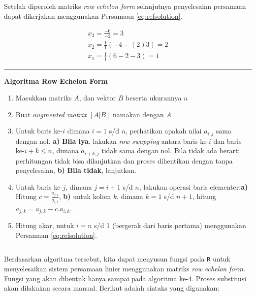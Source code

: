 \documentclass[]{book}
\providecommand{\tightlist}{%
  \setlength{\itemsep}{0pt}\setlength{\parskip}{0pt}}
\theoremstyle{definition}
\theoremstyle{definition}
\theoremstyle{definition}
\theoremstyle{remark}
\begin{document}
Setelah diperoleh matriks \emph{row echelon form} selanjutnya penyelesaian persamaan dapat dikerjakan menggunakan Persamaan \eqref{eq:refsolution}.

\begin{equation*}
\begin{matrix}
  x_3=\frac{-6}{-2}=3 \\
  x_2=\frac{1}{1}\left(-4-\left(2\right)3\right)=2 \\
  x_1=\frac{1}{1}\left(6-2-3\right)=1
\end{matrix}
\end{equation*}

\begin{center}\rule{0.5\linewidth}{\linethickness}\end{center}

\textbf{Algoritma Row Echelon Form}

\begin{enumerate}
\def\labelenumi{\arabic{enumi}.}
\tightlist
\item
  Masukkan matriks \(A\), dan vektor \(B\) beserta ukurannya \(n\)
\item
  Buat \emph{augmented matrix} \(\left[A|B\right]\) namakan dengan \(A\)
\item
  Untuk baris ke-\(i\) dimana \(i=1\) s/d \(n\), perhatikan apakah nilai \(a_{i,j}\) sama dengan nol. \textbf{a)} \textbf{Bila iya}, lakukan \emph{row swapping} antara baris ke-\(i\) dan baris ke-\(i+k\leq n\), dimana \(a_{i+k,j}\) tidak sama dengan nol. Bila tidak ada berarti perhitungan tidak bisa dilanjutkan dan proses dihentikan dengan tanpa penyelesaian, \textbf{b)} \textbf{Bila tidak}, lanjutkan.
\item
  Untuk baris ke-\(j\), dimana \(j=i+1\) s/d \(n\), lakukan operasi baris elementer:\textbf{a)} Hitung \(c=\frac{a_{j,i}}{a_{i,i}}\), \textbf{b)} untuk kolom \(k\), dimana \(k=1\) s/d \(n+1\), hitung \(a_{j,k}=a_{j,k}-c.a_{i,k}\).
\item
  Hitung akar, untuk \(i=n\) s/d 1 (bergerak dari baris pertama) menggunakan Persamaan \eqref{eq:refsolution}.
\end{enumerate}

\begin{center}\rule{0.5\linewidth}{\linethickness}\end{center}

Berdasarkan algoritma tersebut, kita dapat menyusun fungsi pada \texttt{R} untuk menyelesaikan sistem persamaan linier menggunakan matriks \emph{row echelon form}. Fungsi yang akan dibentuk hanya sampai pada algoritma ke-4. Proses substitusi akan dilakukan secara manual. Berikut adalah sintaks yang digunakan:
\end{document}
